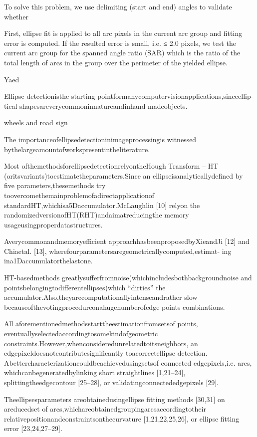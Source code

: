 \documentclass[a4paper]{report}
\begin{document}
To solve this problem, we use delimiting (start and
end) angles to validate whether

First, ellipse fit is applied to all arc pixels
in the current arc group and fitting error is computed. If the resulted error is
small, i.e. ≤ 2.0 pixels, we test the current arc group for the spanned angle ratio
(SAR) which is the ratio of the total length of arcs in the group over the perimeter
of the yielded ellipse.


Yaed

Ellipse detectionisthe
starting pointformanycomputervisionapplications,sinceellip-
tical shapesareverycommoninnatureandinhand-madeobjects.

wheels and road sign

The importanceofellipsedetectioninimageprocessingis
witnessed bythelargeamountofworkspresentintheliterature.

Most ofthemethodsforellipsedetectionrelyontheHough
Transform – HT (oritsvariants)toestimatetheparameters.Since
an ellipseisanalyticallydefined by five parameters,thesemethods
try toovercomethemainproblemofadirectapplicationof
standardHT,whichisa5Daccumulator.McLaughlin [10] relyon
the randomizedversionofHT(RHT)andaimatreducingthe
memory usageusingproperdatastructures.

Averycommonandmemoryefficient
approachhasbeenproposedbyXieandJi [12] and Chiaetal.
[13], wherefourparametersaregeometricallycomputed,estimat-
ing ina1Daccumulatorthelastone.

HT-basedmethods
greatlysufferfromnoise(whichincludesbothbackgroundnoise
and pointsbelongingtodifferentellipses)which “dirties” the
accumulator.Also,theyarecomputationallyintenseandrather
slow becauseofthevotingprocedureonahugenumberofedge
points combinations.

All aforementionedmethodsstarttheestimationfromsetsof
points, eventuallyselectedaccordingtosomekindofgeometric
constraints.However,whenconsideredunrelatedtoitsneighbors,
an edgepixeldoesnotcontributesignificantly toacorrectellipse
detection. Abettercharacterizationcouldbeachievedusingsetsof
connected edgepixels,i.e. arcs, whichcanbegeneratedbylinking
short straightlines [1,21–24], splittingtheedgecontour [25–28],
or validatingconnectededgepixels [29].

Theellipsesparameters
areobtainedusingellipse fitting methods [30,31] on areducedset
of arcs,whichareobtainedgroupingarcsaccordingtotheir
relativepositionandconstraintsonthecurvature [1,21,22,25,26],
or ellipse fitting error [23,24,27–29].
\end{document}
